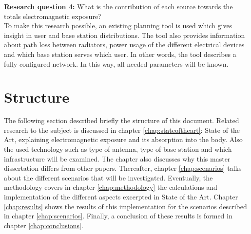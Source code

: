 \textbf{Research question 4:} What is the contribution of each source towards the totals electromagnetic exposure?\\

To make this research possible, an existing planning tool is used which gives insight in user and base station distributions.
The tool also provides information about path loss between radiators, power usage of the different electrical devices and which base station serves which user. In other words, the tool describes 
a fully configured network.
In this way, all needed parameters will be known.



\section{Structure}
\label{sec:structure}
The following section described briefly the structure of this document. Related research to the subject is discussed in chapter \ref{chap:stateoftheart}: State of the Art, explaining
electromagnetic exposure and its absorption into the body. Also the used technology such as type of antenna, type of base station and 
which infrastructure will be examined. The chapter also discusses why this master dissertation differs from other papers.
Thereafter, chapter \ref{chap:scenarios} talks about the different scenarios that will be investigated. 
Eventually, the methodology covers in chapter \ref{chap:methodology} the calculations and implementation of the different aspects excerpted in State of the Art.
Chapter \ref{chap:results} shows the results of this 
implementation for the scenarios described in chapter \ref{chap:scenarios}. 
Finally, a conclusion of these results is formed in chapter \ref{chap:conclusions}.

